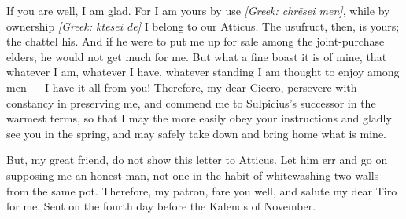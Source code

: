 

 If you are well, I am glad. For I am yours by use \textit{[Greek: chrēsei men]}, while by ownership \textit{[Greek: ktēsei de]} I belong to our Atticus. The usufruct, then, is yours; the chattel his. And if he were to put me up for sale among the joint-purchase elders, he would not get much for me. But what a fine boast it is of mine, that whatever I am, whatever I have, whatever standing I am thought to enjoy among men --- I have it all from you! Therefore, my dear Cicero, persevere with constancy in preserving me, and commend me to Sulpicius's successor in the warmest terms, so that I may the more easily obey your instructions and gladly see you in the spring, and may safely take down and bring home what is mine.

 But, my great friend, do not show this letter to Atticus. Let him err and go on supposing me an honest man, not one in the habit of whitewashing two walls from the same pot. Therefore, my patron, fare you well, and salute my dear Tiro for me. Sent on the fourth day before the Kalends of November.
